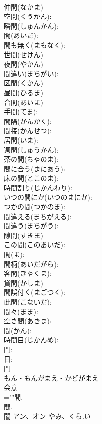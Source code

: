 \documentclass[8pt]{extreport}
\begin{document}
\begin{CJK}{UTF8}{min}
\\	仲間(なかま): 
\\	空間(くうかん): 
\\	瞬間(しゅんかん): 
\\	間(あいだ): 
\\	間も無く(まもなく): 
\\	世間(せけん): 
\\	夜間(やかん): 
\\	間違い(まちがい): 
\\	区間(くかん): 
\\	昼間(ひるま): 
\\	合間(あいま): 
\\	手間(てま): 
\\	間隔(かんかく): 
\\	間接(かんせつ): 
\\	居間(いま): 
\\	週間(しゅうかん): 
\\	茶の間(ちゃのま): 
\\	間に合う(まにあう): 
\\	床の間(とこのま): 
\\	時間割り(じかんわり): 
\\	いつの間にか(いつのまにか): 
\\	つかの間(つかのま): 
\\	間違える(まちがえる): 
\\	間違う(まちがう): 
\\	隙間(すきま): 
\\	この間(このあいだ): 
\\	間(ま): 
\\	間柄(あいだがら): 
\\	客間(きゃくま): 
\\	貸間(かしま): 
\\	間誤付く(まごつく): 
\\	此間(こないだ): 
\\	間々(まま): 
\\	空き間(あきま): 
\\	間(かん): 
\\	時間目(じかんめ): 
\\	門: 
\\	日: 
\\	門	
\\	もん・もんがまえ・かどがまえ	
\\	会意 
\\	=""間.
\\	間.
\\	闇	アン、オン	やみ、くら.い		

\end{CJK}
\end{document}

